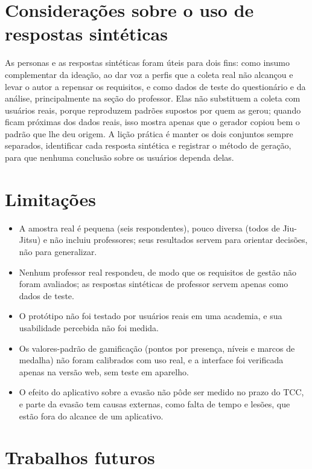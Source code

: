 \section{Considerações sobre o uso de respostas sintéticas}

As personas e as respostas sintéticas foram úteis para dois fins: como
insumo complementar da ideação, ao dar voz a perfis que a coleta real não
alcançou e levar o autor a repensar os requisitos, e como dados de teste
do questionário e da análise, principalmente na seção do professor. Elas não substituem a coleta com
usuários reais, porque reproduzem padrões supostos por quem as gerou;
quando ficam próximas dos dados reais, isso mostra apenas que o gerador
copiou bem o padrão que lhe deu origem. A lição prática é manter os dois
conjuntos sempre separados, identificar cada resposta sintética e
registrar o método de geração, para que nenhuma conclusão sobre os
usuários dependa delas.

\section{Limitações}

\begin{itemize}
  \item A amostra real é pequena (seis respondentes), pouco diversa
        (todos de Jiu-Jitsu) e não incluiu professores; seus resultados
        servem para orientar decisões, não para generalizar.
  \item Nenhum professor real respondeu, de modo que os requisitos de
        gestão não foram avaliados; as respostas sintéticas de professor
        servem apenas como dados de teste.
  \item O protótipo não foi testado por usuários reais em uma academia, e
        sua usabilidade percebida não foi medida.
  \item Os valores-padrão de gamificação (pontos por presença, níveis e
        marcos de medalha) não foram calibrados com uso real, e a interface
        foi verificada apenas na versão web, sem teste em aparelho.
  \item O efeito do aplicativo sobre a evasão não pôde ser medido no prazo
        do TCC, e parte da evasão tem causas externas, como falta de tempo
        e lesões, que estão fora do alcance de um aplicativo.
\end{itemize}

\section{Trabalhos futuros}

